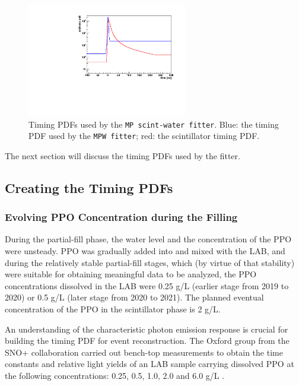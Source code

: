 \begin{figure}[htbp]
	\centering	
	\includegraphics[width=7cm]{scintpdf.pdf}
	\caption[Timing PDFs used by the \texttt{MP scint-water fitter}.]{Timing PDFs used by the \texttt{MP scint-water fitter}. Blue: the timing PDF used by the \texttt{MPW fitter}; red: the scintillator timing PDF.}
	\label{partialpdf}
\end{figure}

The next section will discuss the timing PDFs used by the fitter.

\subsection{Creating the Timing PDFs}

\subsubsection{Evolving PPO Concentration during the Filling}\label{sect:differentPPOconcen}

During the partial-fill phase, the water level and the concentration of the PPO were unsteady. PPO was gradually added into and mixed with the LAB, and during the relatively stable partial-fill stages, which (by virtue of that stability) were suitable for obtaining meaningful data to be analyzed, the PPO concentrations dissolved in the LAB were 0.25 g/L (earlier stage from 2019 to 2020) or 0.5 g/L (later stage from 2020 to 2021). The planned eventual concentration of the PPO in the scintillator phase is 2 g/L.

An understanding of the characteristic photon emission response is crucial for building the timing PDF for event reconstruction. The Oxford group from the SNO+ collaboration carried out bench-top measurements to obtain the time constants and relative light yields of an LAB sample carrying dissolved PPO at the following concentrations: 0.25, 0.5, 1.0, 2.0 and 6.0 g/L \cite{oxfordMeasurement0,oxfordMeasurement}.

